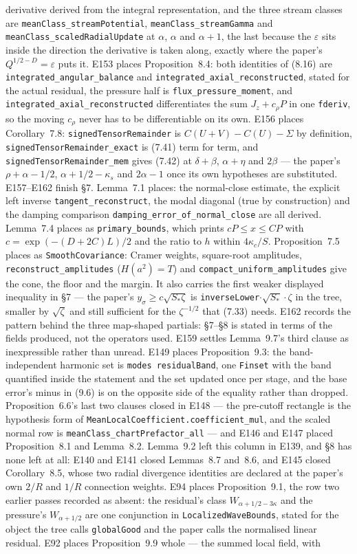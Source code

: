 \documentclass[11pt]{article}
\newcommand{\ct}[1]{\texttt{#1}}
\theoremstyle{plain}
\theoremstyle{definition}
\theoremstyle{remark}
\begin{document}
derivative derived from the integral representation, and the three stream classes are \ct{meanClass\_streamPotential}, \ct{meanClass\_streamGamma} and \ct{meanClass\_scaledRadialUpdate} at $\alpha$, $\alpha$ and $\alpha+1$, the last because the $\varepsilon$ sits inside the direction the derivative is taken along, exactly where the paper's $Q^{1/2-D}=\varepsilon$ puts it. E153 places Proposition~8.4: both identities of (8.16) are \ct{integrated\_angular\_balance} and \ct{integrated\_axial\_reconstructed}, stated for the actual residual, the pressure half is \ct{flux\_pressure\_moment}, and \ct{integrated\_axial\_reconstructed} differentiates the sum $J_z+c_\rho P$ in one \ct{fderiv}, so the moving $c_\rho$ never has to be differentiable on its own. E156 places Corollary~7.8: \ct{signedTensorRemainder} is $C(U+V)-C(U)-\Sigma$ by definition, \ct{signedTensorRemainder\_exact} is (7.41) term for term, and \ct{signedTensorRemainder\_mem} gives (7.42) at $\delta+\beta$, $\alpha+\eta$ and $2\beta$ --- the paper's $\rho+\alpha-1/2$, $\alpha+1/2-\kappa_s$ and $2\alpha-1$ once its own hypotheses are substituted.  E157--E162 finish \S7. Lemma~7.1 places: the normal-close estimate, the explicit left inverse \ct{tangent\_reconstruct}, the modal diagonal (true by construction) and the damping comparison \ct{damping\_error\_of\_normal\_close} are all derived. Lemma~7.4 places as \ct{primary\_bounds}, which prints $cP\le x\le CP$ with $c=\exp(-(D+2C)L)/2$ and the ratio to $h$ within $4\kappa_c/S$. Proposition~7.5 places as \ct{SmoothCovariance}: Cramer weights, square-root amplitudes, \ct{reconstruct\_amplitudes} ($H(a^2)=T$) and \ct{compact\_uniform\_amplitudes} give the cone, the floor and the margin. It also carries the first weaker displayed inequality in \S7 --- the paper's $y_\sigma\ge c\sqrt{S_*\zeta}$ is \ct{inverseLower}$\cdot\sqrt{S_*}\cdot\zeta$ in the tree, smaller by $\sqrt{\zeta}$ and still sufficient for the $\zeta^{-1/2}$ that (7.33) needs. E162 records the pattern behind the three map-shaped partials: \S7--\S8 is stated in terms of the fields produced, not the operators used. E159 settles Lemma~9.7's third clause as inexpressible rather than unread. E149 places Proposition~9.3: the band-independent harmonic set is \ct{modes residualBand}, one \ct{Finset} with the band quantified inside the statement and the set updated once per stage, and the base error's minus in (9.6) is on the opposite side of the equality rather than dropped. Proposition~6.6's last two clauses closed in E148 --- the pre-cutoff rectangle is the hypothesis form of \texttt{MeanLocalCoefficient.coefficient\_mul}, and the scaled normal row is \texttt{meanClass\_chartPrefactor\_all} --- and E146 and E147 placed Proposition~8.1 and Lemma~8.2. Lemma~9.2 left this column in E139, and §8 has none left at all: E140 and E141 closed Lemmas~8.7 and~8.6, and E145 closed Corollary~8.5, whose two radial divergence identities are declared at the paper's own $2/R$ and $1/R$ connection weights. E94 places Proposition~9.1, the row two earlier passes recorded as absent: the residual's class $W_{\alpha+1/2-3\kappa}$ and the pressure's $W_{\alpha+1/2}$ are one conjunction in \texttt{LocalizedWaveBounds}, stated for the object the tree calls \texttt{globalGood} and the paper calls the normalised linear residual. E92 places Proposition~9.9 whole --- the summed local field, with
\end{document}
